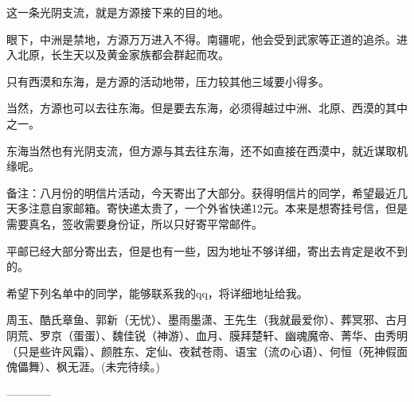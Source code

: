 \begin{this_body}
这一条光阴支流，就是方源接下来的目的地。

眼下，中洲是禁地，方源万万进入不得。南疆呢，他会受到武家等正道的追杀。进入北原，长生天以及黄金家族都会群起而攻。

只有西漠和东海，是方源的活动地带，压力较其他三域要小得多。

当然，方源也可以去往东海。但是要去东海，必须得越过中洲、北原、西漠的其中之一。

东海当然也有光阴支流，但方源与其去往东海，还不如直接在西漠中，就近谋取机缘呢。

备注：八月份的明信片活动，今天寄出了大部分。获得明信片的同学，希望最近几天多注意自家邮箱。寄快递太贵了，一个外省快递12元。本来是想寄挂号信，但是需要真名，签收需要身份证，所以只好寄平常邮件。

平邮已经大部分寄出去，但是也有一些，因为地址不够详细，寄出去肯定是收不到的。

希望下列名单中的同学，能够联系我的qq，将详细地址给我。

周玉、酷氏章鱼、郭新（无忧）、墨雨墨潇、王先生（我就最爱你）、葬冥邪、古月阴荒、罗京（蛋蛋）、魏佳锐（神游）、血月、膜拜楚轩、幽魂魔帝、菁华、由秀明（只是些许风霜）、颜胜东、定仙、夜弑苍雨、语宝（流の心语）、何恒（死神假面傀儡舞）、枫无涯。(未完待续。)

------------

\end{this_body}

